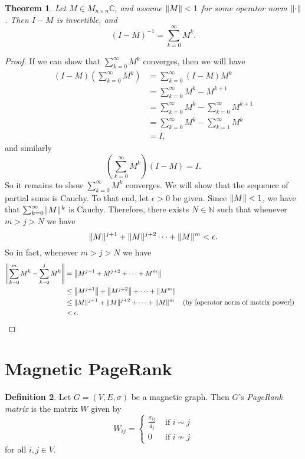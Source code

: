 \documentclass[12pt]{article}
\newtheorem{thm}{Theorem}
\theoremstyle{definition}
\newtheorem{defn}[thm]{Definition}
\newcommand{\N}{\mathbb N}
\newcommand{\C}{\mathbb C}
\DeclarePairedDelimiter\norm{\lVert}{\rVert}
\begin{document}
\begin{thm}\label{inverse of I - M}
Let $M \in M_{n \times n} \C$, and assume $\norm{M} < 1$ for some operator norm $\norm{\cdot}$. Then $I - M$ is invertible, and
$$
(I - M)^{-1} = \sum_{k=0}^\infty M^k.
$$
\end{thm}
\begin{proof}
If we can show that $\sum_{k=0}^\infty M^k$ converges, then we will have 
\begin{align*}
(I - M) \left( \sum_{k=0}^\infty M^k \right) 
&= \sum_{k=0}^\infty (I - M) M^k \\
&= \sum_{k=0}^\infty M^k - M^{k+1} \\
&= \sum_{k=0}^\infty M^k - \sum_{k=0}^\infty M^{k+1} \\
&= \sum_{k=0}^\infty M^k - \sum_{k=1}^\infty M^{k} \\
&= I,
\end{align*}
and similarly $$\left( \sum_{k=0}^\infty M^k \right) (I-M) = I.$$
So it remains to show $\sum_{k=0}^\infty M^k$ converges. We will show that the sequence of partial sums is Cauchy. To that end, let $\epsilon > 0$ be given. Since $\norm{M} < 1$, we have that $\sum_{k=0}^\infty \norm{M}^k$ is Cauchy. Therefore, there exists $N \in \N$ such that whenever $m > j > N$ we have 
$$
\norm{M}^{j+1} + \norm{M}^{j+2} \dots + \norm{M}^{m} < \epsilon.
$$
So in fact, whenever $m > j > N$ we have 
\begin{align*}
\norm*{\sum_{k=0}^m M^k - \sum_{k=0}^j M^k}
&= \norm*{M^{j+1} + M^{j+2} + \dots + M^{m}} \\
&\leq \norm*{M^{j+1}} + \norm*{M^{j+2}} + \dots + \norm*{M^{m}} \\
&\leq \norm{M}^{j+1} + \norm{M}^{j+2} + \dots + \norm{M}^{m} && \text{(by \cref{operator norm of matrix power})} \\
&< \epsilon.
\end{align*}
\end{proof}
 
\pagebreak
 
\section{Magnetic PageRank}

\begin{defn}\label{defn PageRank matrix}
Let $G=(V, E, \sigma)$ be a magnetic graph. Then $G$'s \textit{PageRank matrix} is the matrix $W$ given by
$$
W_{ij} = 
\begin{cases}
\frac{\sigma_{ij}}{d_j} &\text{ if } i \sim j \\
0 &\text{ if } i \not\sim j
\end{cases}
$$
for all $i, j \in V$.
\end{defn}
\end{document}

